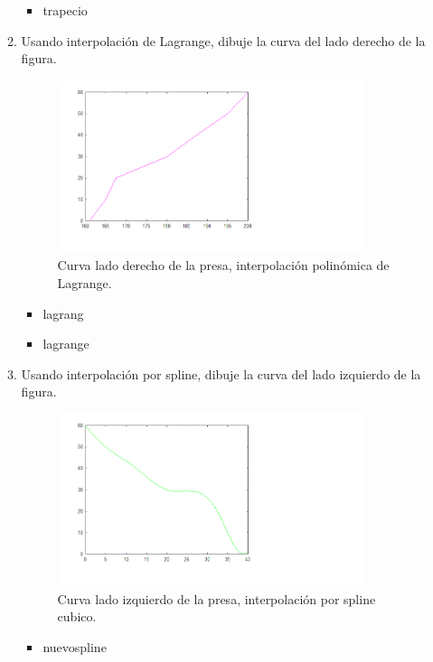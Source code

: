 \documentclass{udpreport}
\begin{document}
\begin{enumerate}
\begin{enumerate}
\begin{itemize}
\item trapecio
\end{itemize}

 \vspace{2.5cm}
 
 \item Usando interpolación de Lagrange, dibuje la curva del lado derecho de la  figura.
 
  \begin{figure}[H]
    \centering
    \includegraphics[width=9cm]{curva_derecha_lagrange}
    \caption{Curva lado derecho de la presa, interpolación polinómica de Lagrange.} \label{fig:curva_derecha_lagrange}
  
\end{figure}
\begin{itemize}
\item lagrang
\item lagrange
\end{itemize}
 \item Usando interpolación por spline, dibuje la curva del lado izquierdo de la  figura.
 \\
 \begin{figure}[H]
    \centering
    \includegraphics[width=9cm]{curvaizq_spline}
    \caption{Curva lado izquierdo de la presa, interpolación por spline cubico.} \label{fig:curvaizq_spline}
\end{figure}
\begin{itemize}
\item nuevospline
\end{itemize}
 \end{enumerate}
 \end{enumerate}
\end{document}
